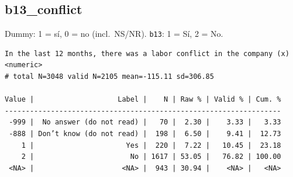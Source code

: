 \documentclass[
  letterpaper,
  DIV=11,
  numbers=noendperiod]{scrreprt}
\newenvironment{Shaded}{\begin{snugshade}}{\end{snugshade}}
\newcommand{\AttributeTok}[1]{\textcolor[rgb]{0.40,0.45,0.13}{#1}}
\newcommand{\DecValTok}[1]{\textcolor[rgb]{0.68,0.00,0.00}{#1}}
\newcommand{\FunctionTok}[1]{\textcolor[rgb]{0.28,0.35,0.67}{#1}}
\newcommand{\NormalTok}[1]{\textcolor[rgb]{0.00,0.23,0.31}{#1}}
\newcommand{\OtherTok}[1]{\textcolor[rgb]{0.00,0.23,0.31}{#1}}
\newcommand{\SpecialCharTok}[1]{\textcolor[rgb]{0.37,0.37,0.37}{#1}}
\newcommand{\StringTok}[1]{\textcolor[rgb]{0.13,0.47,0.30}{#1}}
\begin{document}
\subsection{b13\_conflict}\label{b13_conflict}

Dummy: 1 = sí, 0 = no (incl.~NS/NR). \texttt{b13}: 1 = Sí, 2 = No.

\begin{Shaded}
\end{Shaded}

\begin{verbatim}
In the last 12 months, there was a labor conflict in the company (x) <numeric> 
# total N=3048 valid N=2105 mean=-115.11 sd=306.85

Value |                    Label |    N | Raw % | Valid % | Cum. %
------------------------------------------------------------------
 -999 |  No answer (do not read) |   70 |  2.30 |    3.33 |   3.33
 -888 | Don’t know (do not read) |  198 |  6.50 |    9.41 |  12.73
    1 |                      Yes |  220 |  7.22 |   10.45 |  23.18
    2 |                       No | 1617 | 53.05 |   76.82 | 100.00
 <NA> |                     <NA> |  943 | 30.94 |    <NA> |   <NA>
\end{verbatim}

\begin{Shaded}
\end{Shaded}
\end{document}
